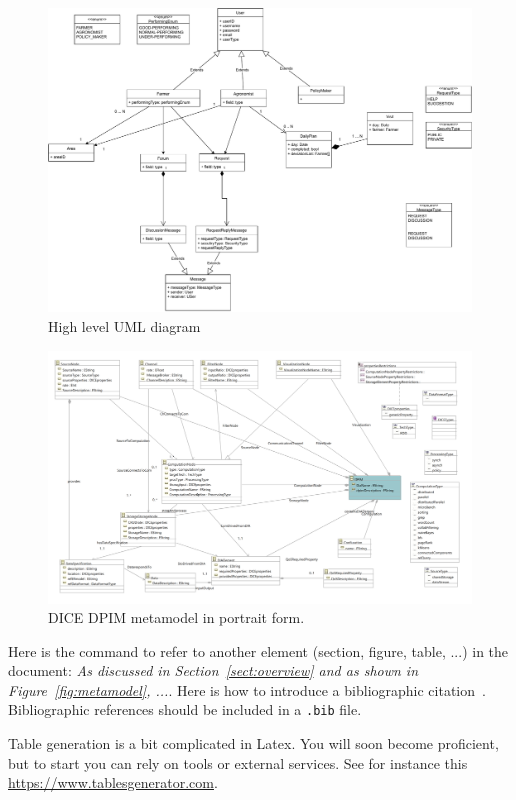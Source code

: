 \begin{figure}[H]
	\centering
    \includegraphics[page=1, width=\textwidth]{Images/SE2 - class diagram.pdf}
	\caption{\label{tab:class_diagram}High level UML diagram}
\end{figure}

\begin{figure}
\centering
\includegraphics[width=\textwidth]{Images/11.png}
\caption{\label{fig:metamodel2}DICE DPIM metamodel in portrait form.}
\end{figure}

Here is the command to refer to another element (section, figure, table, ...) in the document: \emph{As discussed in Section~\ref{sect:overview} and as shown in Figure~\ref{fig:metamodel}, ...}. Here is how to introduce a bibliographic citation~\cite{DAM}. Bibliographic references should be included in a \texttt{.bib} file. 

Table generation is a bit complicated in Latex. You will soon become proficient, but to start you can rely on tools or external services. See for instance this \href{https://www.tablesgenerator.com}{https://www.tablesgenerator.com}. 
